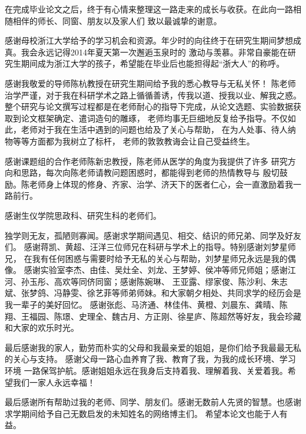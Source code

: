 \cleardoublepage
{}

在完成毕业论文之后，终于有心情来整理这一路走来的成长与收获。在此向一路相随相伴的师长、同窗、朋友以及家人们
致以最诚挚的谢意。

感谢母校浙江大学给予的学习机会和资源。年少时的向往终于在研究生期间梦想成真。我会永远记得2014年夏天第一次邂逅玉泉时的
激动与羡慕。非常自豪能在研究生期间成为浙江大学的孩子，希望能在毕业后也能担得起“浙大人”的称呼。

感谢我敬爱的导师陈杭教授在研究生期间给予我的悉心教导与无私关怀！
陈老师治学严谨，对于我在科研学术之路上循循善诱，传我以道、授我以业、解我之惑。
整个研究与论文撰写过程都是在老师耐心的指导下完成，从论文选题、实验数据获取到论文框架确定、遣词造句的雕琢，
老师均事无巨细地反复给予指导。不仅如此，老师对于我在生活中遇到的问题也给及了关心与帮助，
在为人处事、待人纳物等等方面都为我树立了标杆，
老师的敦敦教诲会让自己受益终生。

感谢课题组的合作老师陈新忠教授，陈老师从医学的角度为我提供了许多
研究方向和思路，每次向陈老师请教问题困惑时，都能得到老师的热情教导与
殷切鼓励。陈老师身上体现的修身、齐家、治学、济天下的医者仁心，会一直激励着我一路前行。

感谢生仪学院思政科、研究生科的老师们。

独学则无友，孤陋则寡闻。感谢求学期间遇见、相交、结识的师兄弟、同学及好友们。
感谢蒋凯、黄超、汪洋三位师兄在科研与学术上的指导。特别感谢刘梦星师兄，
在我有任何困惑与需要时给予无私的关心与帮助，刘梦星师兄永远是我的偶像。
感谢实验室李杰、由佳、吴灶全、刘龙、王梦婷、侯冲等师兄师姐；感谢江河、孙玉彤、高欢等同侪同窗；感谢陈婉琳、
王亚露、缪家俊、陈沙利、朱志斌、张梦鸽、冯静雯、徐艺菲等师弟师妹。和大家朝夕相处、共同求学的经历会是我一辈子的美好回忆。
感谢张彪、马济通、林佳伟、黄橙、刘晨东、龚晴、陈翔、王福园、陈璟、史理全、魏古月、方正刚、徐星庐、陈超然等好友，我会珍藏和大家的欢乐时光。


最后感谢我的家人，勤劳而朴实的父母和我最亲爱的姐姐，是你们给予我最最无私的关心与支持。
感谢父母一路心血养育了我、教育了我，为我的成长环境、学习环境
一路保驾护航。感谢姐姐永远在我身后支持着我、理解着我、关爱着我。希望我们一家人永远幸福！

最后感谢所有帮助过我的老师、同学、朋友们。感谢无数前人先贤的智慧。也感谢求学期间给予自己无数启发的未知姓名的网络博主们。
希望本论文也能于人有益。



